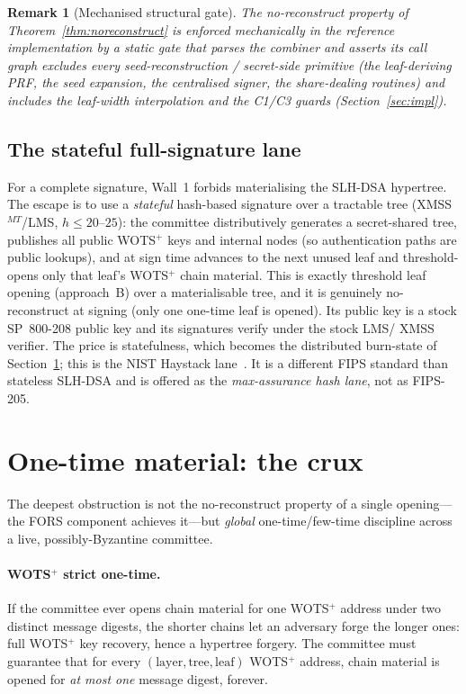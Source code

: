 \documentclass[11pt,a4paper]{article}
\newtheorem{remark}{Remark}
\begin{document}
\begin{remark}[Mechanised structural gate]
The no-reconstruct property of Theorem~\ref{thm:noreconstruct} is enforced
mechanically in the reference implementation by a static gate that parses the
combiner and asserts its call graph excludes every seed-reconstruction / secret-side
primitive (the leaf-deriving PRF, the seed expansion, the centralised signer, the
share-dealing routines) and includes the leaf-width interpolation and the C1/C3
guards (Section~\ref{sec:impl}).
\end{remark}

\subsection{The stateful full-signature lane}
\label{sec:fors-stateful}

For a complete signature, Wall~1 forbids materialising the SLH-DSA hypertree. The
escape is to use a \emph{stateful} hash-based signature over a tractable tree
(XMSS$^{MT}$/LMS, $h \le 20\text{--}25$): the committee distributively generates a
secret-shared tree, publishes all public WOTS$^+$ keys and internal nodes (so
authentication paths are public lookups), and at sign time advances to the next
unused leaf and threshold-opens only that leaf's WOTS$^+$ chain material. This is
exactly threshold leaf opening (approach~B) over a materialisable tree, and it is
genuinely no-reconstruct at signing (only one one-time leaf is opened). Its public
key is a stock SP~800-208 public key and its signatures verify under the stock LMS/
XMSS verifier. The price is statefulness, which becomes the distributed burn-state of
Section~\ref{sec:onetime}; this is the NIST Haystack lane~\cite{haystack}. It is a
different FIPS standard than stateless SLH-DSA and is offered as the
\emph{max-assurance hash lane}, not as FIPS-205.

\section{One-time material: the crux}
\label{sec:onetime}

The deepest obstruction is not the no-reconstruct property of a single opening---the
FORS component achieves it---but \emph{global} one-time/few-time discipline across a
live, possibly-Byzantine committee.

\paragraph{WOTS$^+$ strict one-time.} If the committee ever opens chain material for
one WOTS$^+$ address under two distinct message digests, the shorter chains let an
adversary forge the longer ones: full WOTS$^+$ key recovery, hence a hypertree
forgery. The committee must guarantee that for every
$(\text{layer},\text{tree},\text{leaf})$ WOTS$^+$ address, chain material is opened
for \emph{at most one} message digest, forever.
\end{document}
